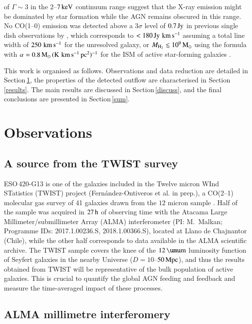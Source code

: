 \documentclass[longauth]{aa}
\newcommand{\kms}{\,\hbox{\hbox{km}\,\hbox{s}$^{-1}$}}
\def\micron{\hbox{$\umu$m}}
\begin{document}
of $\Gamma \sim 3$ in the $2$--$7\, \rm{keV}$ continuum range suggest that the X-ray emission might be dominated by star formation while the AGN remains obscured in this range. No CO(1--0) emission was detected above a $3 \sigma$ level of $0.7\, \rm{Jy}$ in previous single dish observations by , which corresponds to $< 180\, \rm{Jy\,\kms}$ assuming a total line width of $250\, \rm{\kms}$ for the unresolved galaxy, or $M_{\rm H_2} \lesssim 10^9\, \rm{M_\odot}$ using the  formula with $\alpha = 0.8\, \rm{M_\odot\,(K\,\kms\,pc^2)^{-1}}$ for the ISM of active star-forming galaxies .

This work is organised as follows. Observations and data reduction are detailed in Section\,\ref{obs}, the properties of the detected outflow are characterised in Section\,\ref{results}. The main results are discussed in Section\,\ref{discuss}, and the final conclusions are presented in Section\,\ref{sum}.

\section{Observations}\label{obs}

\subsection{A source from the TWIST survey}\label{twist}
ESO\,420-G13 is one of the galaxies included in the Twelve micron WInd STatistics (TWIST) project (Fern\'andez-Ontiveros et al. in prep.), a CO(2--1) molecular gas survey of 41 galaxies drawn from the $12$ micron sample . Half of the sample was acquired in $27\,\rm{h}$ of observing time with the Atacama Large Millimeter/submillimeter Array (ALMA) interferometer (PI: \mbox{M. Malkan}; Programme IDs: 2017.1.00236.S, 2018.1.00366.S), located at Llano de Chajnantor (Chile), while the other half corresponds to data available in the ALMA scientific archive. The TWIST sample covers the knee of the $12\, \rm{\micron}$ luminosity function of Seyfert galaxies in the nearby Universe ($D = 10$--$50\, \rm{Mpc}$), and thus the results obtained from TWIST will be representative of the bulk population of active galaxies. This is crucial to quantify the global AGN feeding and feedback and measure the time-averaged impact of these processes.

\subsection{ALMA millimetre interferomery}
\end{document}
